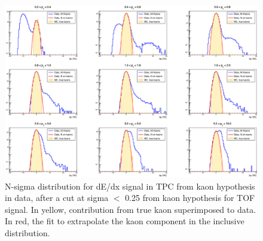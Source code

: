\begin{figure}[!h]
 \centering
 \includegraphics[angle=0, width=13cm]{./FigCap5/DataKaonComponents.eps}
 \caption{N-sigma distribution for dE/dx signal in TPC from kaon hypothesis in data, after a cut at sigma $<$ 0.25 from kaon hypothesis for TOF signal. In yellow, contribution from true kaon superimposed to data. In red, the fit to extrapolate the kaon component in the inclusive distribution.}
 \label{fig:DataPionsTOF} 
\end{figure}

